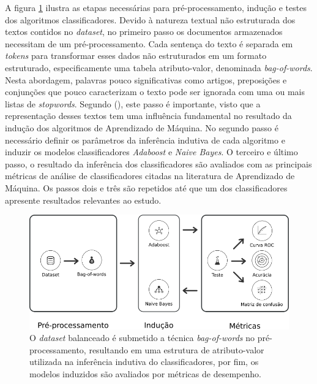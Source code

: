 A figura \ref{figure:metodologia_3} ilustra as etapas necessárias para 
pré-processamento, indução e testes dos algoritmos classificadores. Devido à 
natureza textual não estruturada dos textos contidos no \textit{dataset}, no 
primeiro passo os documentos armazenados necessitam de um pré-processamento. 
Cada sentença do texto é separada em \textit{tokens} para transformar esses 
dados não estruturados em um formato estruturado, especificamente uma tabela 
atributo-valor, denominada \textit{bag-of-words}. Nesta abordagem, palavras 
pouco significativas como artigos, preposições e conjunções que pouco 
caracterizam o texto pode ser ignorada com uma ou mais listas de 
\textit{stopwords}. Segundo  
(\citeyear{matsubara2003pretext}), este passo é importante, visto que a 
representação desses textos tem uma influência fundamental no resultado da 
indução dos algoritmos de Aprendizado de Máquina. No segundo passo é 
necessário definir os parâmetros da inferência indutiva de cada algoritmo e 
induzir os modelos classificadores \textit{Adaboost} e \textit{Naive Bayes}. 
O terceiro e último passo, o resultado da inferência dos classificadores são 
avaliados com as principais métricas de análise de classificadores citadas na 
literatura de Aprendizado de Máquina. Os passos dois e três são repetidos até 
que um dos classificadores apresente resultados relevantes ao estudo.

\begin{figure}[H]
\begin{center}
    \includegraphics[scale=0.60]{images/metodologia_3.png}
\end{center}
\caption{O \textit{dataset} balanceado é submetido a técnica 
\textit{bag-of-words} no pré-processamento, resultando em uma estrutura de 
atributo-valor utilizada na inferência indutiva do classificadores, por fim, os 
modelos induzidos são avaliados por métricas de desempenho.}
\label{figure:metodologia_3}
\end{figure}

